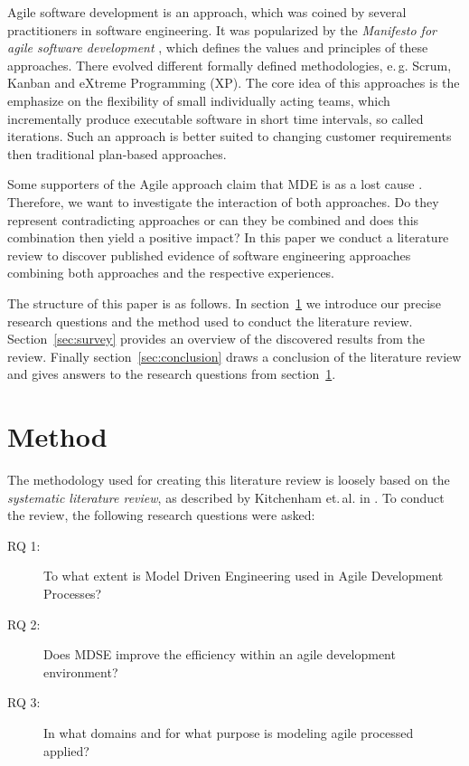 \documentclass[10pt, a4paper, twocolumn]{article}
\begin{document}
Agile software development is an approach, which was coined by several practitioners in software engineering.
It was popularized by the \emph{Manifesto for agile software development} \cite{secondaryAgileManifesto}, which defines the values and principles of these approaches. 
There evolved different formally defined methodologies, e.\,g. Scrum, Kanban and eXtreme Programming (XP).
The core idea of this approaches is the emphasize on the flexibility of small individually acting teams, which incrementally produce executable software in short time intervals, so called iterations.
Such an approach is better suited to changing customer requirements then traditional plan-based approaches.

Some supporters of the Agile approach claim that MDE is as a lost cause \cite{2}. 
Therefore, we want to investigate the interaction of both approaches. 
Do they represent contradicting approaches or can they be combined and does this combination then yield a positive impact?
In this paper we conduct a literature review to discover published evidence of software engineering approaches combining both approaches and the respective experiences. 

The structure of this paper is as follows.
In section~\ref{sec:method} we introduce our precise research questions and the method used to conduct the literature review.
Section~\ref{sec:survey} provides an overview of the discovered results from the review.
Finally section~\ref{sec:conclusion} draws a conclusion of the literature review and gives answers to the research questions from section~\ref{sec:method}.

\section{Method}
\label{sec:method}

The methodology used for creating this literature review is loosely based on the \emph{systematic literature review}, as described by Kitchenham et.\,al. in \cite{secondaryKitchenhamSLR}.
To conduct the review, the following research questions were asked:
\begin{description}
\item[RQ 1:] To what extent is Model Driven Engineering used in Agile Development Processes?
\item[RQ 2:] Does MDSE improve the efficiency within an agile development environment?
\item[RQ 3:] In what domains and for what purpose is modeling agile processed applied?
\end{description}
\end{document}
